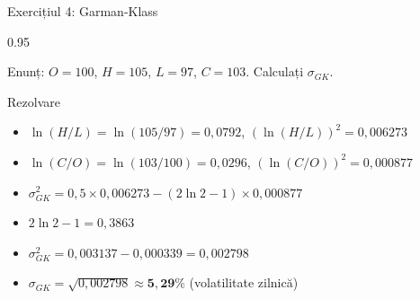\documentclass[9pt, aspectratio=169, t]{beamer}
\begin{document}
\begin{frame}[shrink=10]{Exercițiul 4: Garman-Klass}
    \begin{cminipage}{0.95\textwidth}
    \begin{block}{Enunț: $O = 100$, $H = 105$, $L = 97$, $C = 103$. Calculați $\sigma_{GK}$.}
    \end{block}
    \vspace{0.1cm}
    \begin{exampleblock}{Rezolvare}
    \begin{itemize}\setlength{\itemsep}{0pt}
        \item $\ln(H/L) = \ln(105/97) = 0{,}0792$, \quad $(\ln(H/L))^2 = 0{,}006273$
        \item $\ln(C/O) = \ln(103/100) = 0{,}0296$, \quad $(\ln(C/O))^2 = 0{,}000877$
        \item $\sigma_{GK}^2 = 0{,}5 \times 0{,}006273 - (2\ln 2 - 1) \times 0{,}000877$
        \item $2\ln 2 - 1 = 0{,}3863$
        \item $\sigma_{GK}^2 = 0{,}003137 - 0{,}000339 = 0{,}002798$
        \item $\sigma_{GK} = \sqrt{0{,}002798} \approx \mathbf{5{,}29\%}$ (volatilitate zilnică)
    \end{itemize}
    \end{exampleblock}
    \end{cminipage}
\end{frame}
\end{document}

